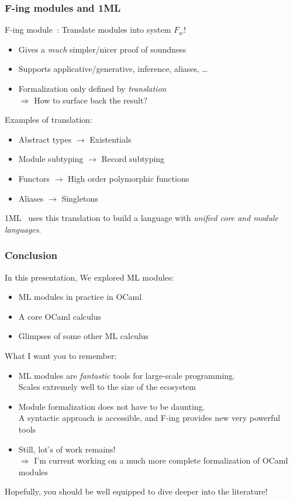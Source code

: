 \documentclass[aspectratio=169,dvipsnames,svgnames,10pt]{beamer}
\newcommand\Y{{\color{Green}{\ding{52}}}\xspace}
\newcommand\N{{\color{Red}{\ding{56}}}\xspace}
\begin{document}
\begin{frame}
  \frametitle{F-ing modules and 1ML}

  F-ing module~\citep{FingModules}: Translate modules into system $F_w$!
  \begin{itemize}
  \item[\Y] Gives a \emph{much} simpler/nicer proof of soundness
  \item[\Y] Supports applicative/generative, inference, aliases, \dots
  \item[\N] Formalization only defined by \emph{translation}\\
    $\Rightarrow$ How to surface back the result?
  \end{itemize}

  Examples of translation:
  \begin{itemize}
  \item Abstract types $\to$ Existentials
  \item Module subtyping $\to$ Record subtyping
  \item Functors $\to$ High order polymorphic functions
  \item Aliases $\to$ Singletons
  \end{itemize}

  1ML~\citep{DBLP:journals/jfp/Rossberg18} uses this translation
  to build a language with \emph{unified core and module languages}.
\end{frame}

\begin{frame}
  \frametitle{Conclusion}

  In this presentation, We explored ML modules:
  \begin{itemize}
  \item ML modules in practice in OCaml
  \item A core OCaml calculus
  \item Glimpses of some other ML calculus
  \end{itemize}
  \pause

  What I want you to remember:
  \begin{itemize}
  \item ML modules are \emph{fantastic} tools for large-scale programming.\\
    Scales extremely well to the size of the ecosystem
  \item Module formalization does not have to be daunting.\\
    A syntactic approach is accessible, and F-ing provides new very powerful tools
  \item Still, lot's of work remains!\\
    $\Rightarrow$ I'm current working on a much more complete formalization of OCaml modules
  \end{itemize}

  Hopefully, you should be well equipped to dive deeper into the literature!
  
\end{frame}
\end{document}
